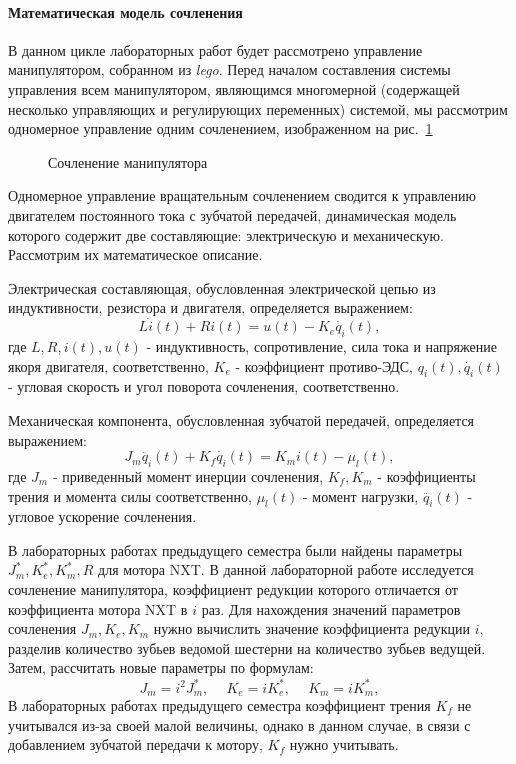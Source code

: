 \paragraph*{Математическая модель сочленения\\}
\hspace*{\parindent}В данном цикле лабораторных работ будет рассмотрено управление манипулятором, собранном из \textit{lego}. Перед началом составления системы управления всем манипулятором, являющимся многомерной (содержащей несколько управляющих и регулирующих переменных)  системой, мы рассмотрим одномерное управление одним сочленением, изображенном на рис.~\ref{soch}

\begin{figure}[h]
	\noindent{}
	\caption{Сочленение манипулятора}
	\label{soch}
\end{figure}

Одномерное управление вращательным сочленением сводится к управлению двигателем постоянного тока с зубчатой передачей, динамическая модель которого содержит две составляющие: электрическую и механическую. Рассмотрим их математическое описание.

Электрическая составляющая, обусловленная электрической цепью из индуктивности, резистора и двигателя, определяется выражением:
\begin{equation}\label{1}
	L\dot{i}(t)+Ri(t)=u(t)-K_e\dot{q_i}(t),
\end{equation}
где $L, R, i(t), u(t)$ - индуктивность, сопротивление, сила тока и напряжение якоря двигателя, соответственно, $K_e$ - коэффициент противо-ЭДС, $q_i(t), \dot{q_i}(t) $ -  угловая скорость и угол поворота сочленения, соответственно.

Механическая  компонента,  обусловленная  зубчатой  передачей, определяется выражением:
\begin{equation}\label{2}
	 J_m\ddot{q_i}(t)+K_f\dot{q_i}(t)=K_mi(t) - \mu_l(t),
\end{equation}
где $J_m$ -  приведенный момент инерции сочленения, $K_f, K_m$ - коэффициенты трения и момента силы соответственно, $\mu_l(t) $ - момент нагрузки, $\ddot{q_i}(t) $ - угловое ускорение сочленения.

В лабораторных работах предыдущего семестра были найдены параметры $J_m^*, K_e^*, K_m^*, R$ для мотора NXT. В данной лабораторной работе исследуется сочленение манипулятора, коэффициент редукции которого отличается от коэффициента мотора NXT в $i$ раз. Для нахождения значений параметров сочленения $J_m, K_e, K_m$ нужно вычислить значение коэффициента редукции $i$, разделив количество зубьев ведомой шестерни на количество зубьев ведущей. Затем, рассчитать новые параметры по формулам:
\begin{equation}\label{coe}
	J_m=i^2J_m^*, \phantom{-} K_e =i K_e^*, \phantom{-} K_m = iK_m^*,
\end{equation}
В лабораторных работах предыдущего семестра коэффициент трения $K_f$ не учитывался из-за своей малой величины, однако в данном случае, в связи с добавлением зубчатой передачи к мотору, $K_f$ нужно учитывать.

